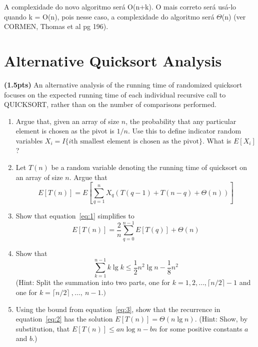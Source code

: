 \documentclass{article}
\begin{document}
A complexidade do novo algoritmo será O(n+k). O mais correto será usá-lo quando k = O(n), pois nesse caso, a complexidade do algoritmo será $\Theta$(n) (ver CORMEN, Thomas et al pg 196). 
\section{Alternative Quicksort Analysis} 
\textbf{(1.5pts)} An alternative analysis of the running time of randomized quicksort focuses on the expected running time of each individual recursive call to QUICKSORT, rather than on the number of comparisons performed.

\begin{enumerate}[label=(\alph*)]
  \item Argue that, given an array of size $n$, the probability that any particular element is chosen as the pivot is $1/n$. Use this to define indicator random variables $X_i = I \{i\mbox{th smallest element is chosen as the pivot}\}$. What is $E[X_i]$?
  \item Let $T(n)$ be a random variable denoting the running time of quicksort on an array of size $n$. Argue that
  \begin{equation}
    E[T(n)]=E\left[\sum_{q=1}^{n}X_q(T(q-1)+T(n-q)+\Theta(n))\right]  
    \label{eq:1}
  \end{equation}
  
  \item Show that equation~\ref{eq:1} simplifies to
  \begin{equation}
    E[T(n)] = \frac{2}{n}\sum_{q=0}^{n-1}E[T(q)] + \Theta(n)
    \label{eq:2}
  \end{equation}

  \item Show that
  \begin{equation}
    \sum_{k=1}^{n-1} k \lg k \leq \frac{1}{2}n^2\lg n - \frac{1}{8}n^2
    \label{eq:3}
  \end{equation}
  (Hint: Split the summation into two parts, one for $k=1,2, \ldots, \lceil n/2 \rceil - 1$ and \\ one for $k=\lceil n/2 \rceil~,\ldots,~n-1.)$

  \item Using the bound from equation~\ref{eq:3}, show that the recurrence in equation~\ref{eq:2} has the solution $E[T(n)]=\Theta(n\lg n)$. (Hint: Show, by substitution, that $E[T(n)] \leq an \log n - bn$ for some positive constants $a$ and $b$.)
\end{enumerate}
\end{document}
